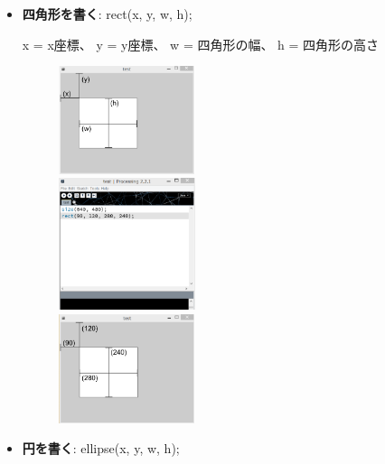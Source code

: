 \documentclass[11pt,a4paper]{jarticle}
\begin{document}
\begin{itemize}
 \item \textbf{四角形を書く}: rect(x, y, w, h);

       x = x座標、
       y = y座標、
       w = 四角形の幅、
       h = 四角形の高さ

\begin{figure}[htbp]
 \begin{minipage}{0.325\hsize}
  \begin{center}
   \includegraphics[width=40mm]{image_of_rect_function.eps}
  \end{center}
 \end{minipage}
 \begin{minipage}{0.325\hsize}
 \begin{center}
  \includegraphics[width=40mm]{Processing_img1-1.eps}
 \end{center}
 \end{minipage}
 \begin{minipage}{0.325\hsize}
 \begin{center}
  \includegraphics[width=40mm]{example_of_rect_function.eps}
 \end{center}
 \end{minipage}
\end{figure}

 \item \textbf{円を書く}: ellipse(x, y, w, h);


\end{itemize}
\end{document}
